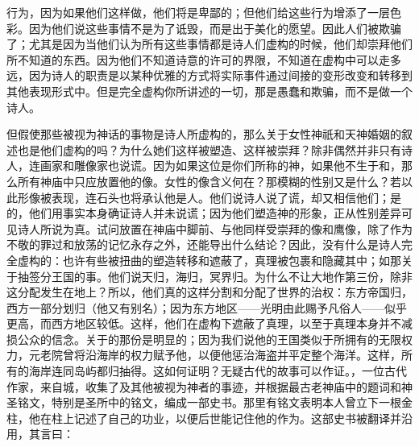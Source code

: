 行为，因为如果他们这样做，他们将是卑鄙的；但他们给这些行为增添了一层色彩。因为他们说这些事情不是为了诋毁，而是出于美化的愿望。因此人们被欺骗了；尤其是因为当他们认为所有这些事情都是诗人们虚构的时候，他们却崇拜他们所不知道的东西。因为他们不知道诗意的许可的界限，不知道在虚构中可以走多远，因为诗人的职责是以某种优雅的方式将实际事件通过间接的变形改变和转移到其他表现形式中。但是完全虚构你所讲述的一切，那是愚蠢和欺骗，而不是做一个诗人。\par

但假使那些被视为神话的事物是诗人所虚构的，那么关于女性神祇和天神婚姻的叙述也是他们虚构的吗？为什么她们这样被塑造、这样被崇拜？除非偶然并非只有诗人，连画家和雕像家也说谎。因为如果这位是你们所称的神，如果他不生于和，那么所有神庙中只应放置他的像。女性的像含义何在？那模糊的性别又是什么？若以此形像被表现，连石头也将承认他是人。他们说诗人说了谎，却又相信他们；是的，他们用事实本身确证诗人并未说谎；因为他们塑造神的形象，正从性别差异可见诗人所说为真。试问放置在神庙中脚前、与他同样受崇拜的像和鹰像，除了作为不敬的罪过和放荡的记忆永存之外，还能导出什么结论？因此，没有什么是诗人完全虚构的：也许有些被扭曲的塑造转移和遮蔽了，真理被包裹和隐藏其中；如那关于抽签分王国的事。他们说天归，海归，冥界归。为什么不让大地作第三份，除非这分配发生在地上？所以，他们真的这样分割和分配了世界的治权：东方帝国归，西方一部分划归（他又有别名）；因为东方地区——光明由此赐予凡俗人——似乎更高，而西方地区较低。这样，他们在虚构下遮蔽了真理，以至于真理本身并不减损公众的信念。关于的那份是明显的；因为我们说他的王国类似于所拥有的无限权力，元老院曾将沿海岸的权力赋予他，以便他惩治海盗并平定整个海洋。这样，所有的海岸连同岛屿都归抽得。这如何证明？无疑古代的故事可以作证。，一位古代作家，来自城，收集了及其他被视为神者的事迹，并根据最古老神庙中的题词和神圣铭文，特别是圣所中的铭文，编成一部史书。那里有铭文表明本人曾立下一根金柱，他在柱上记述了自己的功业，以便后世能记住他的作为。这部史书被翻译并沿用，其言曰：\par

